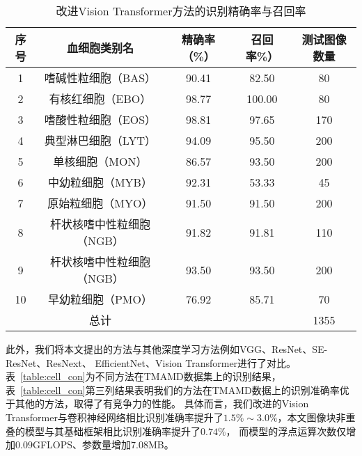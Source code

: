 \begin{table}[htbp]
  \caption{改进Vision Transformer方法的识别精确率与召回率}   
  \centering 
  \label{table:cell_tmamd}
  \begin{tabular}{ccccc}
    \toprule[2pt]
    序号 & 血细胞类别名  &  精确率（\%） & 召回率\%） & 测试图像数量 \\
    \midrule[1.5pt] 
    1  & 嗜碱性粒细胞（BAS）      & 90.41 & 82.50 & 80 \\ 
    2  & 有核红细胞（EBO）        & 98.77 & 100.00 & 80   \\ 
    3  & 嗜酸性粒细胞（EOS）      & 98.81 & 97.65 & 170   \\ 
    4  & 典型淋巴细胞（LYT）      & 94.09 & 95.50 & 200   \\ 
    5  & 单核细胞（MON）          & 86.57 & 93.50 & 200   \\ 
    6  & 中幼粒细胞（MYB）        & 92.31 & 53.33 & 45  \\ 
    7  & 原始粒细胞（MYO）        & 91.50 & 91.50 & 200   \\ 
    8  & 杆状核嗜中性粒细胞（NGB） & 91.82 & 91.81 & 110   \\ 
    9  & 杆状核嗜中性粒细胞（NGB） & 93.50 & 93.50 & 200   \\  
    10 & 早幼粒细胞（PMO）        & 76.92 & 85.71 & 70  \\  
    \hline
       & 总计                    &      &     & 1355   \\  
    \bottomrule[2pt]      
  \end{tabular} 
\end{table}

此外，我们将本文提出的方法与其他深度学习方法例如VGG\cite{2014Very}、ResNet\cite{he2016deep}、SE-ResNet\cite{hu2018squeeze}、ResNext\cite{xie2017aggregated}、
EfficientNet\cite{tan2019efficientnet}、Vision Transformer\cite{dosovitskiy2020image}进行了对比。
表~\ref{table:cell_con}为不同方法在TMAMD数据集上的识别结果，表~\ref{table:cell_con}第三列结果表明我们的方法在TMAMD数据上的识别准确率优于其他的方法，取得了有竞争力的性能。
具体而言，我们改进的Vision Transformer与卷积神经网络相比识别准确率提升了$1.5\% \sim 3.0\%$，本文图像块非重叠的模型与其基础框架相比识别准确率提升了$0.74\%$，
而模型的浮点运算次数仅增加$0.09$GFLOPS、参数量增加$7.08$MB。

